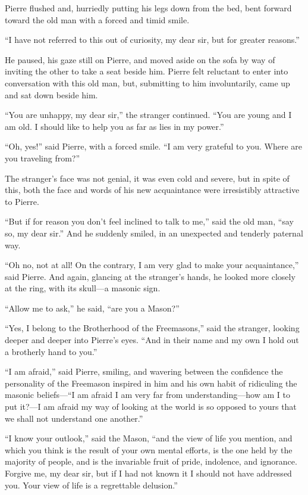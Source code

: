 Pierre flushed and, hurriedly putting his legs down from the bed,
bent forward toward the old man with a forced and timid smile.

``I have not referred to this out of curiosity, my dear sir, but
for greater reasons.''

He paused, his gaze still on Pierre, and moved aside on the sofa
by way of inviting the other to take a seat beside him. Pierre
felt reluctant to enter into conversation with this old man, but,
submitting to him involuntarily, came up and sat down beside him.

``You are unhappy, my dear sir,'' the stranger continued. ``You
are young and I am old. I should like to help you as far as lies
in my power.''

``Oh, yes!'' said Pierre, with a forced smile. ``I am very
grateful to you.  Where are you traveling from?''

The stranger's face was not genial, it was even cold and severe,
but in spite of this, both the face and words of his new
acquaintance were irresistibly attractive to Pierre.

``But if for reason you don't feel inclined to talk to me,'' said
the old man, ``say so, my dear sir.'' And he suddenly smiled, in
an unexpected and tenderly paternal way.

``Oh no, not at all! On the contrary, I am very glad to make your
acquaintance,'' said Pierre. And again, glancing at the
stranger's hands, he looked more closely at the ring, with its
skull---a masonic sign.

``Allow me to ask,'' he said, ``are you a Mason?''

``Yes, I belong to the Brotherhood of the Freemasons,'' said the
stranger, looking deeper and deeper into Pierre's eyes. ``And in
their name and my own I hold out a brotherly hand to you.''

``I am afraid,'' said Pierre, smiling, and wavering between the
confidence the personality of the Freemason inspired in him and
his own habit of ridiculing the masonic beliefs---``I am afraid I
am very far from understanding---how am I to put it?---I am
afraid my way of looking at the world is so opposed to yours that
we shall not understand one another.''

``I know your outlook,'' said the Mason, ``and the view of life
you mention, and which you think is the result of your own mental
efforts, is the one held by the majority of people, and is the
invariable fruit of pride, indolence, and ignorance. Forgive me,
my dear sir, but if I had not known it I should not have
addressed you. Your view of life is a regrettable delusion.''

